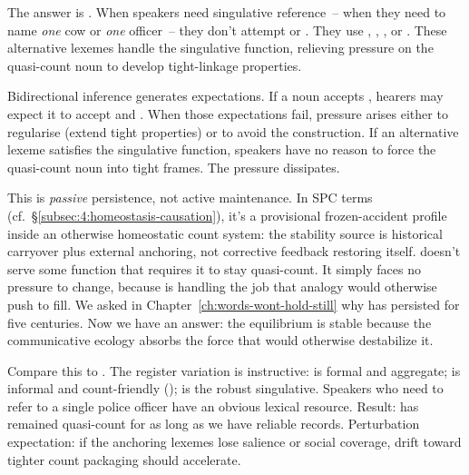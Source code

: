 The answer is . When speakers need singulative reference~-- when they need to name \emph{one} cow or \emph{one} officer~-- they don't attempt \ungram{} or \ungram{}. They use , , , or . These alternative lexemes handle the singulative function, relieving pressure on the quasi-count noun to develop tight-linkage properties.

Bidirectional inference generates expectations. If a noun accepts , hearers may expect it to accept  and . When those expectations fail, pressure arises either to regularise (extend tight properties) or to avoid the construction. If an alternative lexeme satisfies the singulative function, speakers have no reason to force the quasi-count noun into tight frames. The pressure dissipates.

This is \emph{passive} persistence, not active maintenance. In SPC terms (cf.\ §\ref{subsec:4:homeostasis-causation}), it's a provisional frozen-accident profile inside an otherwise homeostatic count system: the stability source is historical carryover plus external anchoring, not corrective feedback restoring  itself.  doesn't serve some function that requires it to stay quasi-count. It simply faces no pressure to change, because  is handling the job that analogy would otherwise push  to fill. We asked in Chapter~\ref{ch:words-wont-hold-still} why  has persisted for five centuries. Now we have an answer: the equilibrium is stable because the communicative ecology absorbs the force that would otherwise destabilize it.

Compare this to . The register variation is instructive:  is formal and aggregate;  is informal and count-friendly ();  is the robust singulative. Speakers who need to refer to a single police officer have an obvious lexical resource. Result:  has remained quasi-count for as long as we have reliable records. Perturbation expectation: if the anchoring lexemes lose salience or social coverage, drift toward tighter count packaging should accelerate.

